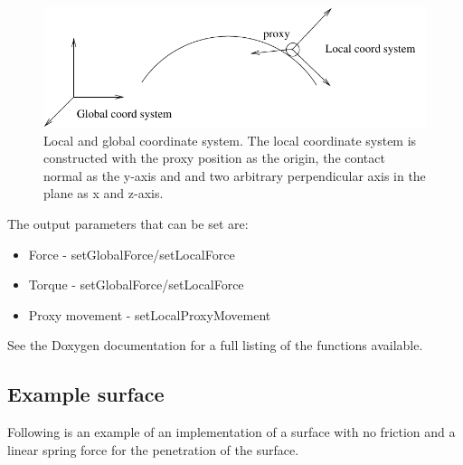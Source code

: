 \begin{figure} 
  \centering 
  \includegraphics{images/coordsystems.pdf}
  \caption{Local and global coordinate system. The local coordinate system is constructed with the proxy position as the origin, the contact normal as the y-axis and and two arbitrary perpendicular axis in the plane as x and z-axis.}
  \label{coordsystems} 
\end{figure}

The output parameters that can be set are:

\begin{itemize}
\item Force - setGlobalForce/setLocalForce
\item Torque - setGlobalForce/setLocalForce
\item Proxy movement - setLocalProxyMovement
\end{itemize}

See the Doxygen documentation for a full listing of the functions available.

\subsection{Example surface}
Following is an example of an implementation of a surface with no friction and a linear spring force for the penetration of the surface.   



